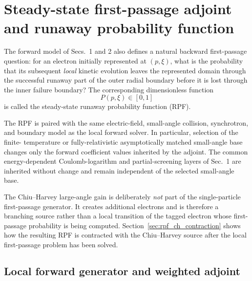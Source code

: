 \documentclass[11pt]{article}
\begin{document}
\section{Steady-state first-passage adjoint and runaway probability function}
\label{sec:steady_adjoint_physics}

The forward model of Secs.~1 and 2 also defines a natural backward first-passage
question: for an electron initially represented at $(p,\xi)$, what is the probability
that its subsequent \emph{local} kinetic evolution leaves the represented domain through
the successful runaway part of the outer radial boundary before it is lost through the
inner failure boundary?  The corresponding dimensionless function
\begin{equation}
  P(p,\xi)\in[0,1]
  \label{eq:rpf_definition}
\end{equation}
is called the steady-state runaway probability function (RPF).

The RPF is paired with the same electric-field, small-angle collision, synchrotron, and
boundary model as the local forward solver.  In particular, selection of the finite-
temperature or fully-relativistic asymptotically matched small-angle base changes only
the forward coefficient values inherited by the adjoint.  The common energy-dependent
Coulomb-logarithm and partial-screening layers of Sec.~1 are inherited without change and
remain independent of the selected small-angle base.

The Chiu--Harvey large-angle gain is deliberately \emph{not} part of the single-particle
first-passage generator.  It creates additional electrons and is therefore a branching
source rather than a local transition of the tagged electron whose first-passage
probability is being computed.  Section~\ref{sec:rpf_ch_contraction} shows how the
resulting RPF is contracted with the Chiu--Harvey source after the local first-passage
problem has been solved.

\subsection{Local forward generator and weighted adjoint}
\label{sec:continuum_adjoint_operator}
\end{document}

